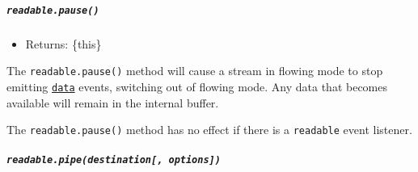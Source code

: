 \subparagraph{\texorpdfstring{\texttt{readable.pause()}}{readable.pause()}}\label{readable.pause}

\begin{itemize}
\tightlist
\item
  Returns: \{this\}
\end{itemize}

The \texttt{readable.pause()} method will cause a stream in flowing mode
to stop emitting
\hyperref[event-data]{\texttt{\textquotesingle{}data\textquotesingle{}}}
events, switching out of flowing mode. Any data that becomes available
will remain in the internal buffer.

\begin{Shaded}
\begin{Highlighting}[]
\OperatorTok{=} \NormalTok{()}\OperatorTok{;}
\NormalTok{(}\OperatorTok{,}\KeywordTok{=\textgreater{}}\NormalTok{ \{}
  \NormalTok{(}\SpecialCharTok{$\{}\SpecialCharTok{\}}\NormalTok{)}\OperatorTok{;}
\NormalTok{()}\OperatorTok{;}
  \NormalTok{(}\NormalTok{)}\OperatorTok{;}
  \NormalTok{(() }\KeywordTok{=\textgreater{}}\NormalTok{ \{}
    \NormalTok{(}\NormalTok{)}\OperatorTok{;}
\NormalTok{()}\OperatorTok{;}
\NormalTok{  \}}\OperatorTok{,} \NormalTok{)}\OperatorTok{;}
\NormalTok{\})}\OperatorTok{;}
\end{Highlighting}
\end{Shaded}

The \texttt{readable.pause()} method has no effect if there is a
\texttt{\textquotesingle{}readable\textquotesingle{}} event listener.

\subparagraph{\texorpdfstring{\texttt{readable.pipe(destination{[},\ options{]})}}{readable.pipe(destination{[}, options{]})}}\label{readable.pipedestination-options}


